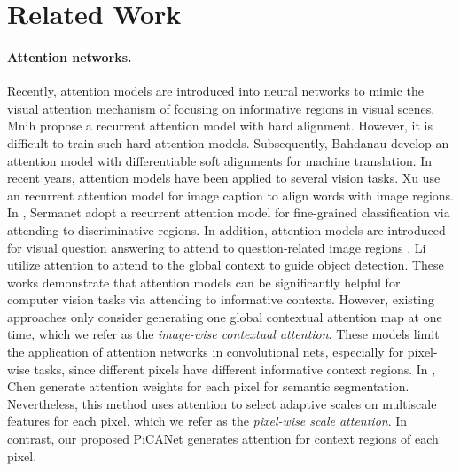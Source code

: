 \documentclass[10pt,twocolumn,letterpaper]{article}
\begin{document}
\section{Related Work}

\paragraph{Attention networks.}

Recently, attention models are introduced into neural networks to mimic the visual attention mechanism of focusing on informative regions in visual scenes.
%
Mnih \etal \cite{mnih2014attention} propose a recurrent attention model with hard alignment.
%
However, it is difficult to train such hard attention models.
%
Subsequently, Bahdanau \etal \cite{bahdanau2015attention} develop an attention model with differentiable soft alignments for machine translation.
%
In recent years, attention models have been applied to several vision tasks.
%
Xu \etal \cite{xu2015show} use an recurrent attention model for image caption to align words with image regions.
%
In \cite{sermanet2014attention}, Sermanet \etal adopt a recurrent attention model for fine-grained classification via attending to discriminative regions.
%
In addition, attention models are introduced for visual question answering to attend to question-related image regions \cite{xu2016ask,yang2016stacked}.
%
Li \etal \cite{li2017attentive} utilize attention to attend to the global context to guide object detection. These works demonstrate that attention models can be significantly helpful for computer vision tasks via attending to informative contexts. However, existing approaches only consider generating one global contextual attention map at one time, which we refer as the \emph{image-wise contextual attention}.
%
These models limit the application of attention networks in convolutional nets, especially for pixel-wise tasks, since different pixels have different informative context regions.
%
In \cite{chen2016attention2scale}, Chen \etal generate attention weights for each pixel for semantic segmentation. Nevertheless, this method uses attention to select adaptive scales on multiscale features for each pixel, which we refer as the \emph{pixel-wise scale attention}. In contrast, our proposed PiCANet generates attention for context regions of each pixel.

\vspace{-3mm}
\end{document}
